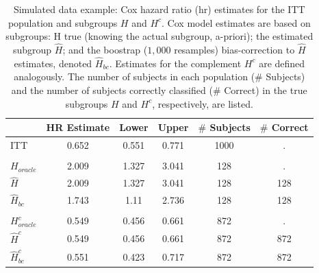 \documentclass[smallextended]{svjour3}
\begin{document}
\begin{table}

\caption{\label{tab:simex_tab}\label{tab:simex} Simulated data example: Cox hazard ratio (hr) estimates for the ITT population and subgroups $H$ and $H^{c}$.
Cox model estimates are based on subgroups: H true (knowing the actual subgroup, a-priori); the estimated subgroup $\hat{H}$; and 
the boostrap ($1,000$ resamples) bias-correction to $\hat{H}$ estimates, denoted $\hat{H}_{bc}$.  Estimates for the complement $H^{c}$ are defined analogously.
The number of subjects in each population ($\#$ Subjects) and the number of subjects correctly classified ($\#$ Correct) in the true subgroups $H$ and $H^{c}$, respectively, are listed.}
\centering
\fontsize{9}{11}\selectfont
\begin{tabular}[t]{lccccc}
\toprule
  & HR Estimate & Lower & Upper & $\#$ Subjects & $\#$ Correct\\
\midrule
ITT & 0.652 & 0.551 & 0.771 & 1000 & .\\
\addlinespace[0.3em]
\multicolumn{6}{l}{\textbf{H subgroup estimates}}\\
\hspace{1em}$H_{oracle}$ & 2.009 & 1.327 & 3.041 & 128 & .\\
\hspace{1em}$\hat{H}$ & 2.009 & 1.327 & 3.041 & 128 & 128\\
\hspace{1em}$\hat{H}_{bc}$ & 1.743 & 1.11 & 2.736 & 128 & 128\\
\addlinespace[0.3em]
\multicolumn{6}{l}{\textbf{H-complement subgroup estimates}}\\
\hspace{1em}$H^{c}_{oracle}$ & 0.549 & 0.456 & 0.661 & 872 & .\\
\hspace{1em}$\hat{H}^{c}$ & 0.549 & 0.456 & 0.661 & 872 & 872\\
\hspace{1em}$\hat{H}^{c}_{bc}$ & 0.551 & 0.423 & 0.717 & 872 & 872\\
\bottomrule
\end{tabular}
\end{table}





\end{document}
